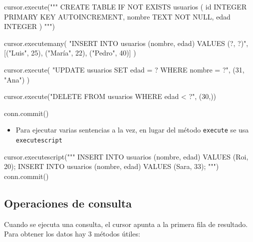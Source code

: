 \documentclass[
]{book}
\newenvironment{Shaded}{\begin{snugshade}}{\end{snugshade}}
\newcommand{\DecValTok}[1]{\textcolor[rgb]{0.00,0.00,0.81}{#1}}
\newcommand{\NormalTok}[1]{#1}
\newcommand{\StringTok}[1]{\textcolor[rgb]{0.31,0.60,0.02}{#1}}
\providecommand{\tightlist}{%
  \setlength{\itemsep}{0pt}\setlength{\parskip}{0pt}}
\theoremstyle{break}
\theoremstyle{nonumberplain}
\begin{document}
\begin{Shaded}
\begin{Highlighting}[]
\NormalTok{cursor.execute(}\StringTok{"""}
\StringTok{CREATE TABLE IF NOT EXISTS usuarios (}
\StringTok{    id INTEGER PRIMARY KEY AUTOINCREMENT,}
\StringTok{    nombre TEXT NOT NULL,}
\StringTok{    edad INTEGER}
\StringTok{)}
\StringTok{"""}\NormalTok{)}

\NormalTok{cursor.executemany(}
    \StringTok{"INSERT INTO usuarios (nombre, edad) VALUES (?, ?)"}\NormalTok{,}
\NormalTok{    [(}\StringTok{"Luis"}\NormalTok{, }\DecValTok{25}\NormalTok{), (}\StringTok{"María"}\NormalTok{, }\DecValTok{22}\NormalTok{), (}\StringTok{"Pedro"}\NormalTok{, }\DecValTok{40}\NormalTok{)]}
\NormalTok{)}

\NormalTok{cursor.execute(}
    \StringTok{"UPDATE usuarios SET edad = ? WHERE nombre = ?"}\NormalTok{,}
\NormalTok{    (}\DecValTok{31}\NormalTok{, }\StringTok{"Ana"}\NormalTok{)}
\NormalTok{)}

\NormalTok{cursor.execute(}\StringTok{"DELETE FROM usuarios WHERE edad \textless{} ?"}\NormalTok{, (}\DecValTok{30}\NormalTok{,))}

\NormalTok{conn.commit()}
\end{Highlighting}
\end{Shaded}

\begin{itemize}
\tightlist
\item
  Para ejecutar varias sentencias a la vez, en lugar del método \texttt{execute} se usa \texttt{executescript}
\end{itemize}

\begin{Shaded}
\begin{Highlighting}[]
\NormalTok{cursor.executescript(}\StringTok{"""}
\StringTok{    INSERT INTO usuarios (nombre, edad) VALUES (\textquotesingle{}Roi\textquotesingle{}, 20);}
\StringTok{    INSERT INTO usuarios (nombre, edad) VALUES (\textquotesingle{}Sara\textquotesingle{}, 33);}
\StringTok{"""}\NormalTok{)}
\NormalTok{conn.commit()}
\end{Highlighting}
\end{Shaded}

\subsection{Operaciones de consulta}\label{operaciones-de-consulta}

Cuando se ejecuta una consulta, el cursor apunta a la primera fila de resultado.
Para obtener los datos hay 3 métodos útiles:
\end{document}
